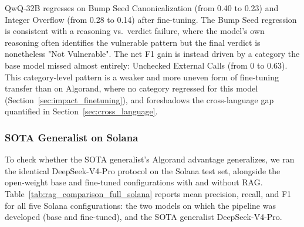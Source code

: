 \documentclass[lettersize,journal]{IEEEtran}
\begin{document}
QwQ-32B regresses on Bump Seed Canonicalization (from 0.40 to 0.23) 
and Integer Overflow (from 0.28 to 0.14)
after fine-tuning. The Bump Seed regression is consistent with a reasoning vs.\ verdict failure,
where the model's own reasoning often identifies the vulnerable pattern but the final verdict is
nonetheless "Not Vulnerable". The net F1 gain is
instead driven by a category the base model missed almost entirely: Unchecked External Calls
(from 0 to 0.63). This category-level pattern is a weaker and more uneven form of 
fine-tuning transfer than on Algorand, where no category
regressed for this model (Section~\ref{sec:impact_finetuning}), and foreshadows the cross-language
gap quantified in Section~\ref{sec:cross_language}.

\subsubsection{SOTA Generalist on Solana}
\label{sec:benchmark_deepseek_solana}

To check whether the SOTA generalist's Algorand advantage generalizes, we ran the identical
DeepSeek-V4-Pro protocol on the Solana test set, alongside the open-weight base and fine-tuned
configurations with and without RAG. Table~\ref{tab:rag_comparison_full_solana} reports mean
precision, recall, and F1 for all five Solana configurations: the
two models on which the pipeline was developed (base and fine-tuned), and the SOTA generalist
DeepSeek-V4-Pro.
\end{document}
